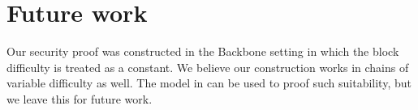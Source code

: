 \section{Future work}

Our security proof was constructed in the Backbone \cite{backbone} setting in
which the block difficulty is treated as a constant. We believe our
construction works in chains of variable difficulty as well. The model in
\cite{backbone2} can be used to proof such suitability, but we leave this for
future work.
